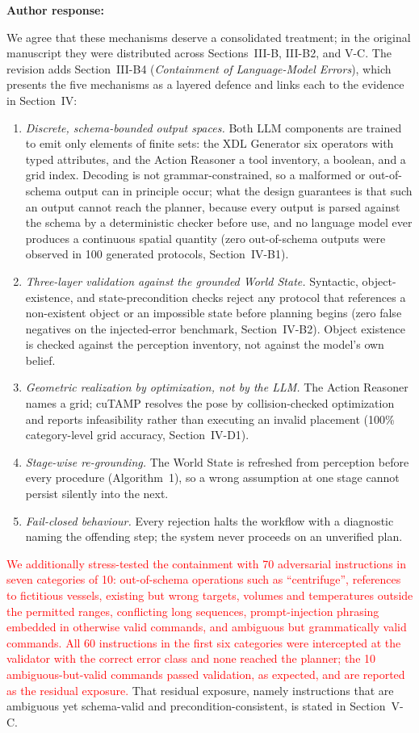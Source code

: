 \documentclass[11pt]{article}
\newcommand{\nd}[1]{\textcolor{red}{#1}}
\newenvironment{response}{\textbf{Author response:}\par\smallskip}{\par\medskip}
\begin{document}
\begin{response}
We agree that these mechanisms deserve a consolidated treatment; in the original manuscript they were distributed across Sections~III-B, III-B2, and V-C.
The revision adds Section~III-B4 (\emph{Containment of Language-Model Errors}), which presents the five mechanisms as a layered defence and links each to the evidence in Section~IV:

\begin{enumerate}[leftmargin=2em]
\item \emph{Discrete, schema-bounded output spaces.}
Both LLM components are trained to emit only elements of finite sets: the XDL Generator six operators with typed attributes, and the Action Reasoner a tool inventory, a boolean, and a grid index.
Decoding is not grammar-constrained, so a malformed or out-of-schema output can in principle occur; what the design guarantees is that such an output cannot reach the planner, because every output is parsed against the schema by a deterministic checker before use, and no language model ever produces a continuous spatial quantity (zero out-of-schema outputs were observed in 100 generated protocols, Section~IV-B1).
\item \emph{Three-layer validation against the grounded World State.}
Syntactic, object-existence, and state-precondition checks reject any protocol that references a non-existent object or an impossible state before planning begins (zero false negatives on the injected-error benchmark, Section~IV-B2).
Object existence is checked against the perception inventory, not against the model's own belief.
\item \emph{Geometric realization by optimization, not by the LLM.}
The Action Reasoner names a grid; cuTAMP resolves the pose by collision-checked optimization and reports infeasibility rather than executing an invalid placement (100\% category-level grid accuracy, Section~IV-D1).
\item \emph{Stage-wise re-grounding.}
The World State is refreshed from perception before every procedure (Algorithm~1), so a wrong assumption at one stage cannot persist silently into the next.
\item \emph{Fail-closed behaviour.}
Every rejection halts the workflow with a diagnostic naming the offending step; the system never proceeds on an unverified plan.
\end{enumerate}
\nd{We additionally stress-tested the containment with 70 adversarial instructions in seven categories of 10: out-of-schema operations such as ``centrifuge'', references to fictitious vessels, existing but wrong targets, volumes and temperatures outside the permitted ranges, conflicting long sequences, prompt-injection phrasing embedded in otherwise valid commands, and ambiguous but grammatically valid commands.
All 60 instructions in the first six categories were intercepted at the validator with the correct error class and none reached the planner; the 10 ambiguous-but-valid commands passed validation, as expected, and are reported as the residual exposure.}
That residual exposure, namely instructions that are ambiguous yet schema-valid and precondition-consistent, is stated in Section~V-C.
\end{response}
\end{document}
